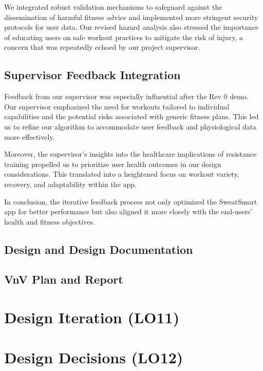 \documentclass{article}
\begin{document}
We integrated robust validation mechanisms to safeguard against the dissemination of harmful fitness advice and implemented more stringent security protocols for user data. Our revised hazard analysis also stressed the importance of educating users on safe workout practices to mitigate the risk of injury, a concern that was repeatedly echoed by our project supervisor.

\subsection{Supervisor Feedback Integration}
Feedback from our supervisor was especially influential after the Rev 0 demo. Our supervisor emphasized the need for workouts tailored to individual capabilities and the potential risks associated with generic fitness plans. This led us to refine our algorithm to accommodate user feedback and physiological data more effectively.

Moreover, the supervisor's insights into the healthcare implications of resistance training propelled us to prioritize user health outcomes in our design considerations. This translated into a heightened focus on workout variety, recovery, and adaptability within the app.

In conclusion, the iterative feedback process not only optimized the SweatSmart app for better performance but also aligned it more closely with the end-users' health and fitness objectives.

\subsection{Design and Design Documentation}

\subsection{VnV Plan and Report}

\section{Design Iteration (LO11)}


\section{Design Decisions (LO12)}
\end{document}
